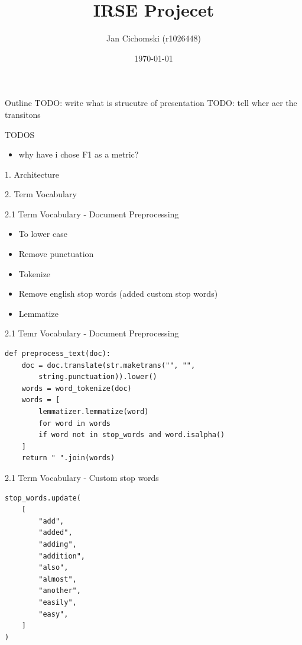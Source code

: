 \documentclass{beamer}
\title{IRSE Projecet}
\author{Jan Cichomski (r1026448)}
\date{\today}
\begin{document}
\begin{frame}
  \titlepage
\end{frame}

\begin{frame}{Outline}
  TODO: write what is strucutre of presentation
  TODO: tell  wher aer the transitons
\end{frame}
\begin{frame}{TODOS}
  \begin{itemize}
    \item  why have i chose F1 as a metric?
  \end{itemize}
\end{frame}

\begin{frame}{1. Architecture}
  \centering
  
\end{frame}

\begin{frame}{2. Term Vocabulary}

\end{frame}

\begin{frame}{2.1 Term Vocabulary - Document Preprocessing}
  \begin{itemize}
    \item To lower case
    \item Remove punctuation
    \item Tokenize
    \item Remove english stop words (added custom stop words)
    \item Lemmatize
  \end{itemize}
\end{frame}

\begin{frame}[fragile]{2.1 Temr Vocabulary - Document Preprocessing}
  \begin{verbatim}
def preprocess_text(doc):
    doc = doc.translate(str.maketrans("", "",
        string.punctuation)).lower()
    words = word_tokenize(doc)
    words = [
        lemmatizer.lemmatize(word)
        for word in words
        if word not in stop_words and word.isalpha()
    ]
    return " ".join(words)
    \end{verbatim}
\end{frame}
\begin{frame}[fragile]{2.1 Term Vocabulary - Custom stop words}
  \begin{verbatim}
stop_words.update(
    [
        "add",
        "added",
        "adding",
        "addition",
        "also",
        "almost",
        "another",
        "easily",
        "easy",
    ]
)
    \end{verbatim}
\end{frame}
\end{document}
